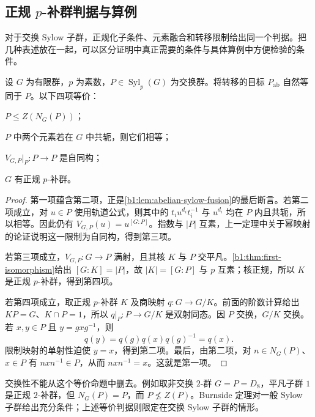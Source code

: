 \subsection{正规 \texorpdfstring{\(p\)}{p}-补群判据与算例}
\label{b1:subsec:C05:03}

对于交换 Sylow 子群，正规化子条件、元素融合和转移限制给出同一个判据。把几种表述放在一起，可以区分证明中真正需要的条件与具体算例中方便检验的条件。

\begin{proposition}\label{b1:prop:abelian-sylow-normal-complement}
	设 \(G\) 为有限群，\(p\) 为素数，\(P\in\operatorname{Syl}_p(G)\) 为交换群。将转移的目标 \(P_{\mathrm{ab}}\) 自然等同于 \(P\)。以下四项等价：
	\begin{equivalences}
		\item \(P\leq Z(N_G(P))\)；
		\item \(P\) 中两个元素若在 \(G\) 中共轭，则它们相等；
		\item \(V_{G,P}|_P:P\rightarrow P\) 是自同构；
		\item \(G\) 有正规 \(p\)-补群。
	\end{equivalences}
\end{proposition}

\begin{proof}
	第一项蕴含第二项，正是\cref{b1:lem:abelian-sylow-fusion}的最后断言。若第二项成立，对 \(u\in P\) 使用轨道公式，则其中的 \(t_i u^{d_i}t_i^{-1}\) 与 \(u^{d_i}\) 均在 \(P\) 内且共轭，所以相等。因此仍有 \(V_{G,P}(u)=u^{[G:P]}\)。指数与 \(|P|\) 互素，上一定理中关于幂映射的论证说明这一限制为自同构，得到第三项。

	若第三项成立，\(V_{G,P}:G\rightarrow P\) 满射，且其核 \(K\) 与 \(P\) 交平凡。\cref{b1:thm:first-isomorphism}给出 \([G:K]=|P|\)，故 \(|K|=[G:P]\) 与 \(p\) 互素；核正规，所以 \(K\) 是正规 \(p\)-补群，得到第四项。

	若第四项成立，取正规 \(p\)-补群 \(K\) 及商映射 \(q:G\rightarrow G/K\)。前面的阶数计算给出 \(KP=G\)、\(K\cap P=1\)，所以 \(q|_P:P\rightarrow G/K\) 是双射同态。因 \(P\) 交换，\(G/K\) 交换。若 \(x,y\in P\) 且 \(y=gxg^{-1}\)，则
	\[
		q(y)=q(g)q(x)q(g)^{-1}=q(x).
	\]
	限制映射的单射性迫使 \(y=x\)，得到第二项。最后，由第二项，对 \(n\in N_G(P)\)、\(x\in P\) 有 \(nxn^{-1}\in P\)，从而 \(nxn^{-1}=x\)。这就是第一项。
\end{proof}

交换性不能从这个等价命题中删去。例如取非交换 \(2\)-群 \(G=P=D_8\)，平凡子群 \(1\) 是正规 \(2\)-补群，但 \(N_G(P)=P\)，而 \(P\nleq Z(P)\)。Burnside 定理对一般 Sylow 子群给出充分条件；上述等价判据则限定在交换 Sylow 子群的情形。

